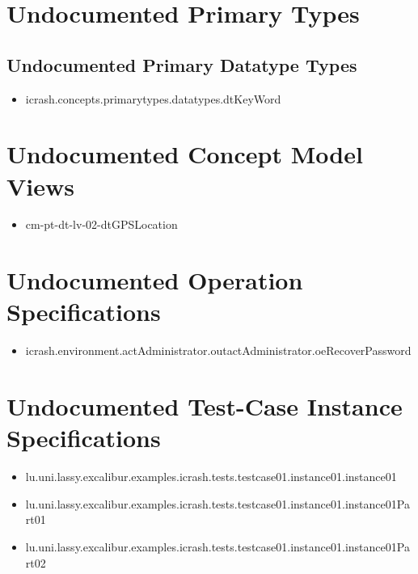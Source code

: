 \section[Undocumented Primary Types]{Undocumented Primary Types}


\subsection[Undocumented Primary Datatype Types]{Undocumented Primary Datatype Types}
\begin{itemize}
\item icrash.concepts.primarytypes.datatypes.dtKeyWord 
\end{itemize}














\section[Undocumented Concept Model Views]{Undocumented Concept Model Views}
\begin{itemize}
\item cm-pt-dt-lv-02-dtGPSLocation 
\end{itemize}


\section[Undocumented Operation Specifications]{Undocumented Operation Specifications}
\begin{itemize}
\item icrash.environment.actAdministrator.outactAdministrator.oeRecoverPassword 
\end{itemize}





\section[Undocumented Test-Case Instance Specifications]{Undocumented Test-Case Instance Specifications}
\begin{itemize}
\item lu.uni.lassy.excalibur.examples.icrash.tests.testcase01.instance01.instance01 
\item lu.uni.lassy.excalibur.examples.icrash.tests.testcase01.instance01.instance01Part01 
\item lu.uni.lassy.excalibur.examples.icrash.tests.testcase01.instance01.instance01Part02 
\end{itemize}



